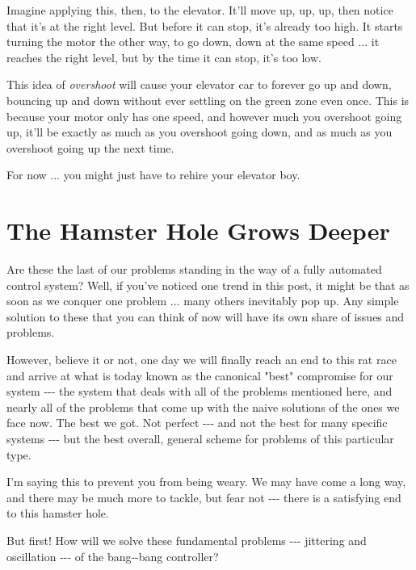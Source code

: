 \documentclass[]{article}
\begin{document}
Imagine applying this, then, to the elevator. It'll move up, up, up, then notice
that it's at the right level. But before it can stop, it's already too high. It
starts turning the motor the other way, to go down, down at the same speed ...
it reaches the right level, but by the time it can stop, it's too low.

This idea of \emph{overshoot} will cause your elevator car to forever go up and
down, bouncing up and down without ever settling on the green zone even once.
This is because your motor only has one speed, and however much you overshoot
going up, it'll be exactly as much as you overshoot going down, and as much as
you overshoot going up the next time.

For now ... you might just have to rehire your elevator boy.

\section{The Hamster Hole Grows Deeper}

Are these the last of our problems standing in the way of a fully automated
control system? Well, if you've noticed one trend in this post, it might be that
as soon as we conquer one problem ... many others inevitably pop up. Any simple
solution to these that you can think of now will have its own share of issues
and problems.

However, believe it or not, one day we will finally reach an end to this rat
race and arrive at what is today known as the canonical "best" compromise for
our system -\/-\/- the system that deals with all of the problems mentioned
here, and nearly all of the problems that come up with the naive solutions of
the ones we face now. The best we got. Not perfect -\/-\/- and not the best for
many specific systems -\/-\/- but the best overall, general scheme for problems
of this particular type.

I'm saying this to prevent you from being weary. We may have come a long way,
and there may be much more to tackle, but fear not -\/-\/- there is a satisfying
end to this hamster hole.

But first! How will we solve these fundamental problems -\/-\/- jittering and
oscillation -\/-\/- of the bang-\/-bang controller?
\end{document}
